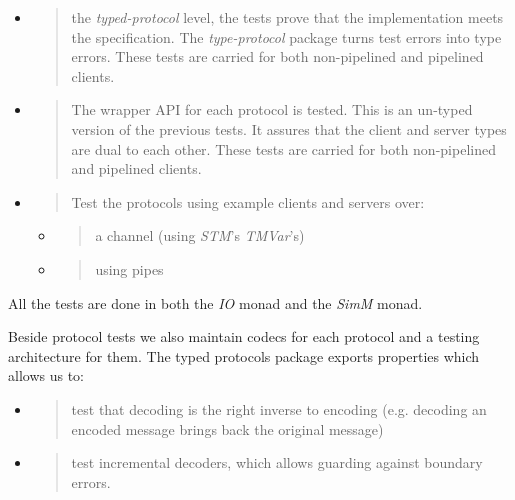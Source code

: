 \documentclass[]{article}
\begin{document}
\begin{itemize}
\item
  \begin{quote}
  the \emph{typed-protocol} level, the tests prove that the
  implementation meets the specification. The \emph{type-protocol}
  package turns test errors into type errors. These tests are carried
  for both non-pipelined and pipelined clients.
  \end{quote}
\item
  \begin{quote}
  The wrapper API for each protocol is tested. This is an un-typed
  version of the previous tests. It assures that the client and server
  types are dual to each other. These tests are carried for both
  non-pipelined and pipelined clients.
  \end{quote}
\item
  \begin{quote}
  Test the protocols using example clients and servers over:
  \end{quote}

  \begin{itemize}
  \item
    \begin{quote}
    a channel (using \emph{STM}'s \emph{TMVar}'s)
    \end{quote}
  \item
    \begin{quote}
    using pipes
    \end{quote}
  \end{itemize}
\end{itemize}

All the tests are done in both the \emph{IO} monad and the \emph{SimM}
monad.

Beside protocol tests we also maintain codecs for each protocol and a
testing architecture for them. The typed protocols package exports
properties which allows us to:

\begin{itemize}
\item
  \begin{quote}
  test that decoding is the right inverse to encoding (e.g. decoding an
  encoded message brings back the original message)
  \end{quote}
\item
  \begin{quote}
  test incremental decoders, which allows guarding against boundary
  errors.
  \end{quote}
\end{itemize}
\end{document}
